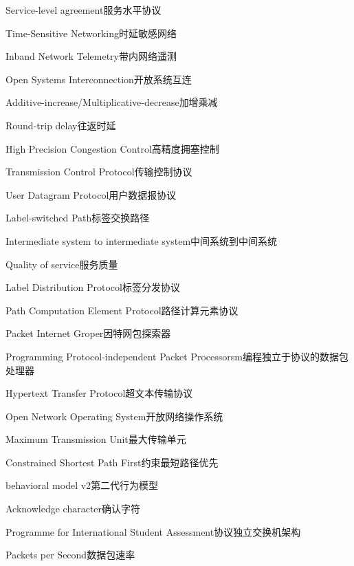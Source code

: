 {Service-level agreement}{服务水平协议}

{Time-Sensitive Networking}{时延敏感网络}

{Inband Network Telemetry}{带内网络遥测}

{Open Systems Interconnection}{开放系统互连}

{Additive-increase/Multiplicative-decrease}{加增乘减}

{Round-trip delay}{往返时延}

{High Precision Congestion Control}{高精度拥塞控制}

{Transmission Control Protocol}{传输控制协议}

{User Datagram Protocol}{用户数据报协议}

{Label-switched Path}{标签交换路径}

{Intermediate system to intermediate system}{中间系统到中间系统}

{Quality of service}{服务质量}

{Label Distribution Protocol}{标签分发协议}

{Path Computation Element Protocol}{路径计算元素协议}

{Packet Internet Groper}{因特网包探索器}

{Programming Protocol-independent Packet Processorsm}{编程独立于协议的数据包处理器}

{Hypertext Transfer Protocol}{超文本传输协议}

{Open Network Operating System}{开放网络操作系统}

{Maximum Transmission Unit}{最大传输单元}

{Constrained Shortest Path First}{约束最短路径优先}

{behavioral model v2}{第二代行为模型}

{Acknowledge character}{确认字符}

{Programme for International Student Assessment}{协议独立交换机架构}

{Packets per Second}{数据包速率}

